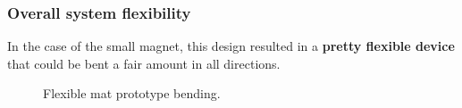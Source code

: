 \subsubsection{Overall system flexibility}
In the case of the small magnet, this design resulted in a \textbf{pretty flexible device} that could be bent a fair amount in all directions.
\begin{figure}[H]
    \centering
    \begin{subfigure}[b]{0.475\textwidth}
        \centering
    \end{subfigure}
    \hfill
    \begin{subfigure}[b]{0.475\textwidth}  
        \centering 
    \end{subfigure}
    \caption{Flexible mat prototype bending.}
    \label{fig: Flexible_mat_bending}
\end{figure}

